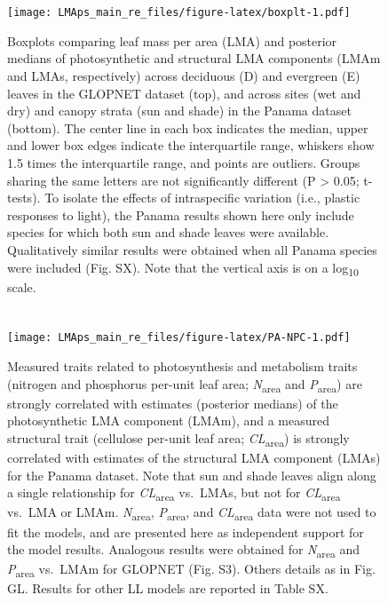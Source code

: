 \documentclass[
  12pt,
]{article}
\begin{document}
\newpage

\hypertarget{section-6}{%
\section{}\label{section-6}}

\begin{figure}
\centering
\texttt{[image: LMAps\_main\_re\_files/figure-latex/boxplt-1.pdf]}
\caption{\label{fig:boxplt}Boxplots comparing leaf mass per area (LMA) and posterior medians of photosynthetic and structural LMA components (LMAm and LMAs, respectively) across deciduous (D) and evergreen (E) leaves in the GLOPNET dataset (top), and across sites (wet and dry) and canopy strata (sun and shade) in the Panama dataset (bottom). The center line in each box indicates the median, upper and lower box edges indicate the interquartile range, whiskers show 1.5 times the interquartile range, and points are outliers. Groups sharing the same letters are not significantly different (P \textgreater{} 0.05; t-tests). To isolate the effects of intraspecific variation (i.e., plastic responses to light), the Panama results shown here only include species for which both sun and shade leaves were available. Qualitatively similar results were obtained when all Panama species were included (Fig. SX). Note that the vertical axis is on a log\textsubscript{10} scale.}
\end{figure}

\newpage

\hypertarget{section-7}{%
\section{}\label{section-7}}

\begin{figure}
\centering
\texttt{[image: LMAps\_main\_re\_files/figure-latex/PA-NPC-1.pdf]}
\caption{\label{fig:PA-NPC}Measured traits related to photosynthesis and metabolism traits (nitrogen and phosphorus per-unit leaf area; \emph{N}\textsubscript{area} and \emph{P}\textsubscript{area}) are strongly correlated with estimates (posterior medians) of the photosynthetic LMA component (LMAm), and a measured structural trait (cellulose per-unit leaf area; \emph{CL}\textsubscript{area}) is strongly correlated with estimates of the structural LMA component (LMAs) for the Panama dataset. Note that sun and shade leaves align along a single relationship for \emph{CL}\textsubscript{area} vs.~LMAs, but not for \emph{CL}\textsubscript{area} vs.~LMA or LMAm. \emph{N}\textsubscript{area}, \emph{P}\textsubscript{area}, and \emph{CL}\textsubscript{area} data were not used to fit the models, and are presented here as independent support for the model results. Analogous results were obtained for \emph{N}\textsubscript{area} and \emph{P}\textsubscript{area} vs.~LMAm for GLOPNET (Fig. S3). Others details as in Fig. GL. Results for other LL models are reported in Table SX.}
\end{figure}
\end{document}
